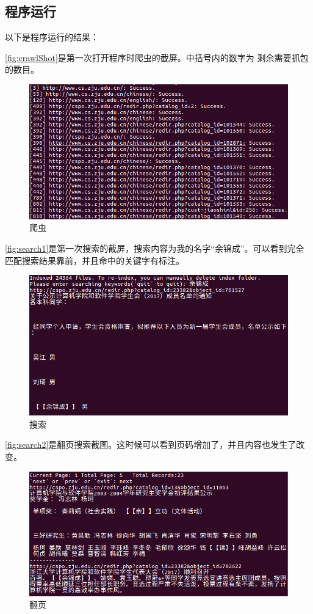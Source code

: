 \documentclass[UTF8,a4paper,12pt]{ctexart}
\begin{document}
\subsection{程序运行}
以下是程序运行的结果：\par
\autoref{fig:crawlShot}是第一次打开程序时爬虫的截屏。中括号内的数字为
剩余需要抓包的数目。\par
\begin{figure}[htbp]
\centering
\includegraphics[scale=0.5]{pictures/0.png}
\caption{爬虫}
\label{fig:crawlShot}
\end{figure}
\autoref{fig:search1}是第一次搜索的截屏，搜索内容为我的名字``余锦成''。可以看到完全
匹配搜索结果靠前，并且命中的关键字有标注。\par
\begin{figure}[htbp]
\centering
\includegraphics[scale=0.5]{pictures/1.png}
\caption{搜索}
\label{fig:search1}
\end{figure}
\autoref{fig:search2}是翻页搜索截图。这时候可以看到页码增加了，并且内容也发生了改变。\par
\begin{figure}[htbp]
\centering
\includegraphics[scale=0.5]{pictures/2.png}
\caption{翻页}
\label{fig:search2}
\end{figure}
\end{document}
